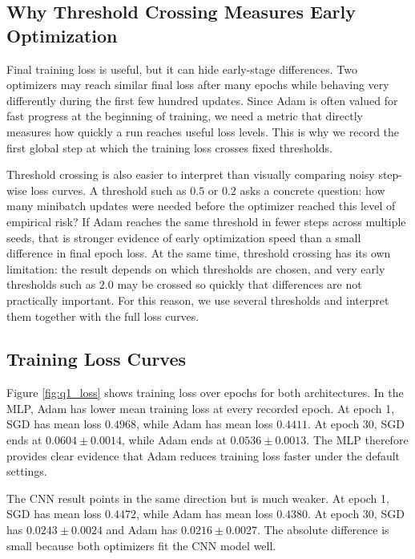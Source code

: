 \documentclass[11pt]{article}
\begin{document}
\subsection{Why Threshold Crossing Measures Early Optimization}

Final training loss is useful, but it can hide early-stage differences. Two optimizers may reach similar final loss after many epochs while behaving very differently during the first few hundred updates. Since Adam is often valued for fast progress at the beginning of training, we need a metric that directly measures how quickly a run reaches useful loss levels. This is why we record the first global step at which the training loss crosses fixed thresholds.

Threshold crossing is also easier to interpret than visually comparing noisy step-wise loss curves. A threshold such as $0.5$ or $0.2$ asks a concrete question: how many minibatch updates were needed before the optimizer reached this level of empirical risk? If Adam reaches the same threshold in fewer steps across multiple seeds, that is stronger evidence of early optimization speed than a small difference in final epoch loss. At the same time, threshold crossing has its own limitation: the result depends on which thresholds are chosen, and very early thresholds such as $2.0$ may be crossed so quickly that differences are not practically important. For this reason, we use several thresholds and interpret them together with the full loss curves.

\subsection{Training Loss Curves}

Figure \ref{fig:q1_loss} shows training loss over epochs for both architectures. In the MLP, Adam has lower mean training loss at every recorded epoch. At epoch 1, SGD has mean loss $0.4968$, while Adam has mean loss $0.4411$. At epoch 30, SGD ends at $0.0604 \pm 0.0014$, while Adam ends at $0.0536 \pm 0.0013$. The MLP therefore provides clear evidence that Adam reduces training loss faster under the default settings.

The CNN result points in the same direction but is much weaker. At epoch 1, SGD has mean loss $0.4472$, while Adam has mean loss $0.4380$. At epoch 30, SGD has $0.0243 \pm 0.0024$ and Adam has $0.0216 \pm 0.0027$. The absolute difference is small because both optimizers fit the CNN model well.
\end{document}
